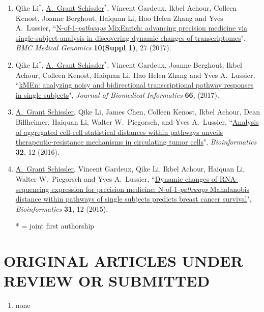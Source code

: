 \documentclass[paper=a4,fontsize=11pt]{scrartcl} %
\newcommand{\NewPart}[2]{\section*{\uppercase{#1} #2 }}
\newcommand{\PaperEntry}[7]{
		\noindent #1, ``\href{#7}{#2}", \textit{#3} \textbf{#4}, #5 (#6).}
\begin{document}
\begin{enumerate}
\item \PaperEntry{Qike Li$^{*}$, \underline{A.~Grant Schissler$^{*}$}, Vincent Gardeux, Ikbel Achour, Colleen Kenost, Joanne Berghout, Haiquan Li, Hao Helen Zhang and Yves A.~Lussier}{N-of-1-\emph{pathways} MixEnrich: advancing precision medicine via single-subject analysis in discovering dynamic changes of transcriptomes}{BMC Medical Genomics}{10(Suppl 1)}{27}{2017}{https://bmcmedgenomics.biomedcentral.com/articles/10.1186/s12920-017-0263-4}

\item \PaperEntry{Qike Li$^{*}$, \underline{A.~Grant Schissler}$^{*}$, Vincent Gardeux, Joanne Berghout, Ikbel Achour, Colleen Kenost, Haiquan Li, Hao Helen Zhang and Yves A.~Lussier}{kMEn: analyzing noisy and bidirectional transcriptional pathway responses in single subjects}{Journal of Biomedical Informatics}{66}{}{2017}{http://www.sciencedirect.com/science/article/pii/S1532046416301836}

\item \PaperEntry{\underline{A.~Grant Schissler}, Qike Li, James Chen, Colleen Kenost, Ikbel Achour, Dean Billheimer, Haiquan Li, Walter W.~Piegorsch, and Yves A.~Lussier}{Analysis of aggregated cell-cell statistical distances within pathways unveils therapeutic-resistance mechanisms in circulating tumor cells}{Bioinformatics}{32}{12}{2016}{http://bioinformatics.oxfordjournals.org/content/32/12/i80.full}

\item \PaperEntry{\underline{A.~Grant Schissler}, Vincent Gardeux, Qike Li, Ikbel Achour, Haiquan Li, Walter W.~Piegorsch and Yves A.~Lussier}{Dynamic changes of RNA-sequencing expression for precision medicine: N-of-1-\textit{pathways} Mahalanobis distance within pathways of single subjects predicts breast cancer survival}{Bioinformatics}{31}{12}{2015}{http://bioinformatics.oxfordjournals.org/content/31/12/i293.full}

  * = joint first authorship
\end{enumerate}


\NewPart{Original articles under review or submitted}{}
\vspace{-7pt}
\begin{enumerate}

\item none
  
\end{enumerate}
\end{document}
